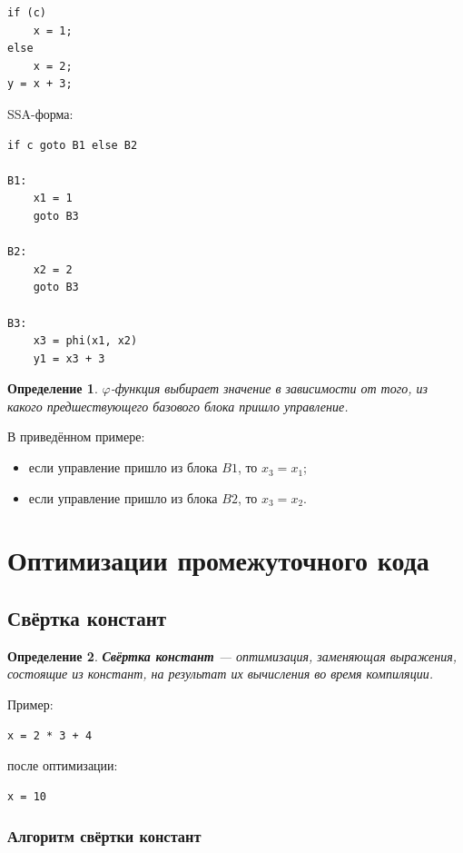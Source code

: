 \documentclass[12pt,a4paper]{article}
\newtheorem{definition}{Определение}
\begin{document}
\begin{lstlisting}
if (c)
    x = 1;
else
    x = 2;
y = x + 3;
\end{lstlisting}

SSA-форма:

\begin{lstlisting}
if c goto B1 else B2

B1:
    x1 = 1
    goto B3

B2:
    x2 = 2
    goto B3

B3:
    x3 = phi(x1, x2)
    y1 = x3 + 3
\end{lstlisting}

\begin{definition}
$\varphi$-функция выбирает значение в зависимости от того, из какого предшествующего базового блока пришло управление.
\end{definition}

В приведённом примере:
\begin{itemize}
    \item если управление пришло из блока $B1$, то $x_3 = x_1$;
    \item если управление пришло из блока $B2$, то $x_3 = x_2$.
\end{itemize}

\section{Оптимизации промежуточного кода}

\subsection{Свёртка констант}

\begin{definition}
\textbf{Свёртка констант} --- оптимизация, заменяющая выражения, состоящие из констант, на результат их вычисления во время компиляции.
\end{definition}

Пример:

\begin{lstlisting}
x = 2 * 3 + 4
\end{lstlisting}

после оптимизации:

\begin{lstlisting}
x = 10
\end{lstlisting}

\subsubsection{Алгоритм свёртки констант}
\end{document}
